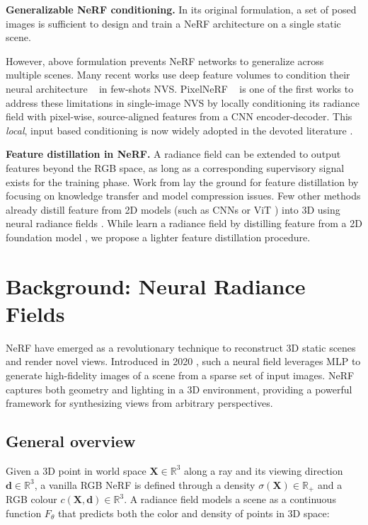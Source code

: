 \noindent\textbf{Generalizable NeRF conditioning.} In its original formulation, a set of posed images is sufficient to design and train a \ac{NeRF} architecture on a single static scene.

However, above formulation prevents \ac{NeRF} networks to generalize across multiple scenes. Many recent works use deep feature volumes to condition their neural architecture ~\citep{wang2021ibrnet,chen2023matchnerf} in few-shots \ac{NVS}. PixelNeRF ~\citep{yu2021pixelnerf} is one of the first works to address these limitations in single-image \ac{NVS} by locally conditioning its radiance field with pixel-wise, source-aligned features from a \ac{CNN} encoder-decoder. This \textit{local}, input based conditioning is now widely adopted in the devoted literature \citep{jang2021codenerf,li2022symmnerf,lin2023vision}.

\noindent\textbf{Feature distillation in NeRF.} A radiance field can be extended to output features beyond the RGB space, as long as a corresponding supervisory signal exists for the training phase. Work from \citep{hinton2015distilling} lay the ground for feature distillation by focusing on knowledge transfer and model compression issues. Few other methods already distill feature from 2D models (such as \ac{CNNs} or {ViT} \citep{dosovitskiy2020vit}) into 3D using neural radiance fields \citep{kobayashi2022decomposing}. While \citep{ye2023featurenerf} learn a radiance field  by distilling feature from a 2D foundation model \citep{oquab2023dinov2}, we propose a lighter feature distillation procedure. 

\section{Background: Neural Radiance Fields}


\ac{NeRF} have emerged as a revolutionary technique to reconstruct 3D static scenes and render novel views. Introduced in 2020 \citep{mildenhall2020nerf}, such a neural field leverages \ac{MLP} to generate high-fidelity images of a scene from a sparse set of input images. \ac{NeRF} captures both geometry and lighting in a 3D environment, providing a powerful framework for synthesizing views from arbitrary perspectives.

\subsection{General overview}

Given a 3D point in world space $\mathbf{X} \in \mathbb{R}^{3}$ along a ray and its viewing direction $\mathbf{d} \in \mathbb{R}^{3}$, a vanilla RGB \ac{NeRF} is defined through a density $\sigma(\mathbf{X})\in \mathbb{R}_{+}$  and a RGB colour $c(\mathbf{X},\mathbf{d}) \in \mathbb{R}^{3}$. A radiance field models a scene as a continuous function $F_{\theta}$ that predicts both the color and density of points in 3D space: 

